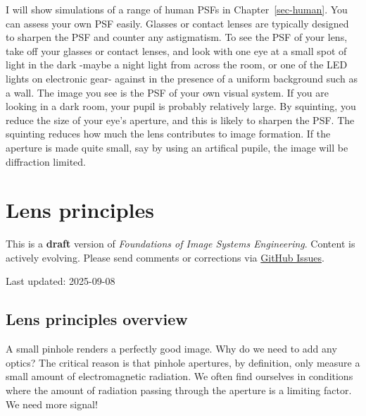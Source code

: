 \documentclass[
  letterpaper,
]{book}
\begin{document}
I will show simulations of a range of human PSFs in
Chapter~\ref{sec-human}. You can assess your own PSF easily. Glasses or
contact lenses are typically designed to sharpen the PSF and counter any
astigmatism. To see the PSF of your lens, take off your glasses or
contact lenses, and look with one eye at a small spot of light in the
dark -maybe a night light from across the room, or one of the LED lights
on electronic gear- against in the presence of a uniform background such
as a wall. The image you see is the PSF of your own visual system. If
you are looking in a dark room, your pupil is probably relatively large.
By squinting, you reduce the size of your eye's aperture, and this is
likely to sharpen the PSF. The squinting reduces how much the lens
contributes to image formation. If the aperture is made quite small, say
by using an artifical pupile, the image will be diffraction limited.

\chapter{Lens principles}\label{sec-optics-lenses}

\begin{tcolorbox}[enhanced jigsaw, colframe=quarto-callout-warning-color-frame, titlerule=0mm, rightrule=.15mm, opacitybacktitle=0.6, colback=white, leftrule=.75mm, coltitle=black, title=\textcolor{quarto-callout-warning-color}{\faExclamationTriangle}\hspace{0.5em}{Work in Progress}, bottomrule=.15mm, colbacktitle=quarto-callout-warning-color!10!white, breakable, left=2mm, bottomtitle=1mm, toptitle=1mm, opacityback=0, arc=.35mm, toprule=.15mm]

This is a \textbf{draft} version of \emph{Foundations of Image Systems
Engineering}. Content is actively evolving. Please send comments or
corrections via \href{https://github.com/wandell/FISE-git/issues}{GitHub
Issues}.

Last updated: 2025-09-08

\end{tcolorbox}

\section{Lens principles overview}\label{sec-optics-lenses-overview}

A small pinhole renders a perfectly good image. Why do we need to add
any optics? The critical reason is that pinhole apertures, by
definition, only measure a small amount of electromagnetic radiation. We
often find ourselves in conditions where the amount of radiation passing
through the aperture is a limiting factor. We need more signal!
\end{document}
